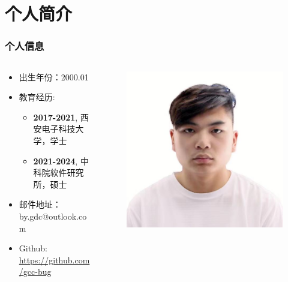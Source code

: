 \documentclass[aspectratio=1610]{beamer}
\begin{document}
\section{个人简介}
\begin{frame}
    \frametitle{个人信息}
    \begin{columns}
        \begin{column}{0.6\textwidth}
            \begin{itemize}
                \setlength{\itemsep}{10pt}
                \item 出生年份：2000.01
                \item 教育经历: 
                \begin{itemize}
                    \item \textbf{2017-2021}, 西安电子科技大学，学士
                    \item \textbf{2021-2024}, 中科院软件研究所，硕士
                \end{itemize}
                \item 邮件地址：by.gdc@outlook.com
                \item Github: \href{https://github.com/gcc-bug}{https://github.com/gcc-bug}
            \end{itemize}
        \end{column}
        \begin{column}{0.4\textwidth}
            \begin{figure}
                \includegraphics[width=.8\textwidth]{gdc}
            \end{figure}
        \end{column}
    \end{columns}
    \end{frame}
\end{document}
